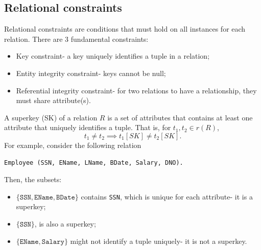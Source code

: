 \documentclass[a4paper, openany]{memoir}
\begin{document}

\subsection{Relational constraints}
Relational constraints are conditions that must hold on all instances for each relation. There are 3 fundamental constraints:
\begin{itemize}
    \item Key constraint- a key uniquely identifies a tuple in a relation;
    \item Entity integrity constraint- keys cannot be null;
    \item Referential integrity constraint- for two relations to have a relationship, they must share attribute(s).
\end{itemize}

A superkey (SK) of a relation $R$ is a set of attributes that contains at least one attribute that uniquely identifies a tuple. That is, for $t_1, t_2 \in r(R)$,
\[t_1 \neq t_2 \implies t_1[SK] \neq t_2[SK].\]
For example, consider the following relation
\begin{verbatim}
Employee (SSN, EName, LName, BDate, Salary, DNO).
\end{verbatim}
Then, the subsets:
\begin{itemize}
    \item $\{\texttt{SSN}, \texttt{EName}, \texttt{BDate}\}$ contains \texttt{SSN}, which is unique for each attribute- it is a superkey;
    \item $\{\texttt{SSN}\}$, is also a superkey;
    \item $\{\texttt{EName}, \texttt{Salary}\}$ might not identify a tuple uniquely- it is not a superkey.
\end{itemize}
\end{document}

